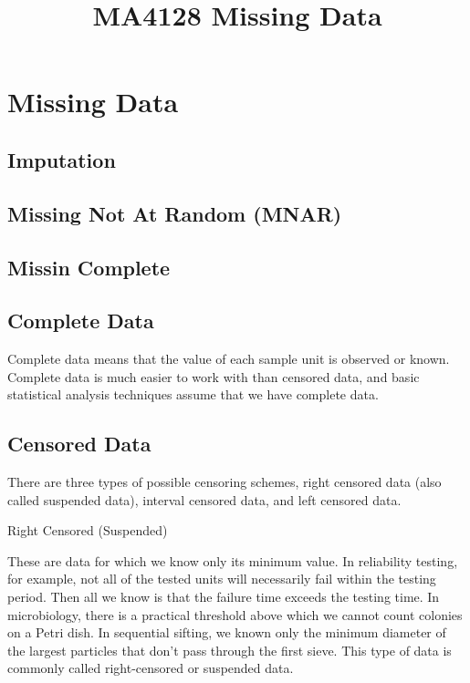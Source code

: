 \documentclass[]{article}
\title{}
\author{}
\begin{document}
\maketitle

\title{MA4128 Missing Data}

\section{Missing Data}

\subsection{Imputation}

\subsection{Missing Not At Random (MNAR)}

\subsection{Missin Complete}

\subsection{Complete Data}

Complete data means that the value of each sample unit is observed or known. Complete data is much easier to work with than censored data, and basic statistical analysis techniques assume that we have complete data.


\subsection{Censored Data}

There are three types of possible censoring schemes, right censored data (also called suspended data), interval censored data, and left censored data.



Right Censored (Suspended)

These are data for which we know only its minimum value. In reliability testing, for example, not all of the tested units will necessarily fail within the testing period. Then all we know is that the failure time exceeds the testing time. In microbiology, there is a practical threshold above which we cannot count colonies on a Petri dish. In sequential sifting, we known only the minimum diameter of the largest particles that don't pass through the first sieve. This type of data is commonly called right-censored or suspended data.
\end{document}
